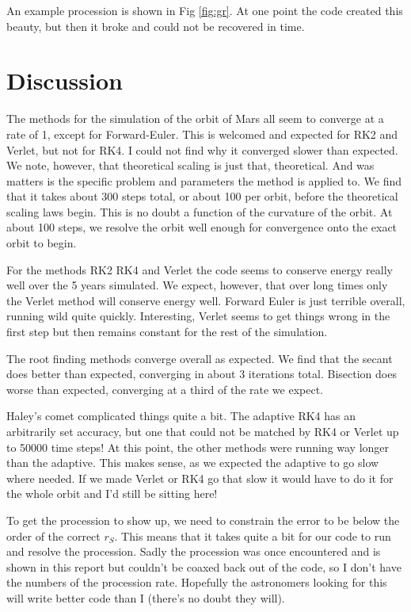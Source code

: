 \documentclass{article}
\begin{document}
An example procession is shown in Fig \ref{fig:gr}. At one point the code created this beauty, but then it broke and could not be recovered in time. 


\section*{Discussion}

The methods for the simulation of the orbit of Mars all seem to converge at a rate of 1, except for Forward-Euler. This is welcomed and expected for RK2 and Verlet, but not for RK4. I could not find why it converged slower than expected. We note, however, that theoretical scaling is just that, theoretical. And was matters is the specific problem and parameters the method is applied to. We find that it takes about 300 steps total, or about 100 per orbit, before the theoretical scaling laws begin. This is no doubt a function of the curvature of the orbit. At about 100 steps, we resolve the orbit well enough for convergence onto the exact orbit to begin. 

For the methods RK2 RK4 and Verlet the code seems to conserve energy really well over the 5 years simulated. We expect, however, that over long times only the Verlet method will conserve energy well. Forward Euler is just terrible overall, running wild quite quickly. Interesting, Verlet seems to get things wrong in the first step but then remains constant for the rest of the simulation. 

The root finding methods converge overall as expected. We find that the secant does better than expected, converging in about 3 iterations total. Bisection does worse than expected, converging at a third of the rate we expect.

Haley's comet complicated things quite a bit. The adaptive RK4 has an arbitrarily set accuracy, but one that could not be matched by RK4 or Verlet up to 50000 time steps! At this point, the other methods were running way longer than the adaptive. This makes sense, as we expected the adaptive to go slow where needed. If we made Verlet or RK4 go that slow it would have to do it for the whole orbit and I'd still be sitting here!

To get the procession to show up, we need to constrain the error to be below the order of the correct $r_S$. This means that it takes quite a bit for our code to run and resolve the procession. Sadly the procession was once encountered and is shown in this report but couldn't be coaxed back out of the code, so I don't have the numbers of the procession rate. Hopefully the astronomers looking for this will write better code than I (there's no doubt they will). 
\end{document}
